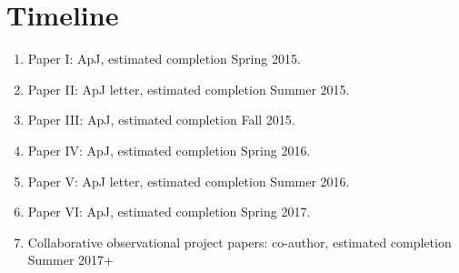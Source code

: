 \documentclass[manuscript]{aastex}
\begin{document}
\section{Timeline}

\begin{enumerate}
\item Paper I: ApJ, estimated completion Spring 2015.
\item Paper II: ApJ letter, estimated completion Summer 2015.
\item Paper III: ApJ, estimated completion Fall 2015.
\item Paper IV: ApJ, estimated completion Spring 2016.
\item Paper V: ApJ letter, estimated completion Summer 2016.
\item Paper VI: ApJ, estimated completion Spring 2017.
\item Collaborative observational project papers: co-author, estimated completion Summer 2017+
\end{enumerate}




\end{document}
